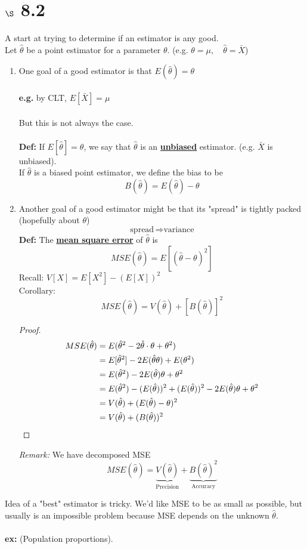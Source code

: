\documentclass[12pt]{article}
\newcommand{\E}[1]{E\left( {#1} \right)}
\newcommand{\brac}[1]{\left[ {#1} \right] }
\newcommand{\xbar}{\bar{X}}
\begin{document}
\section*{$\S$ 8.2}
A start at trying to determine if an estimator is any good.\vspace{0.08in}\\
Let $\hat{\theta}$ be a point estimator for a parameter $\theta$. (e.g. $\theta = \mu, \quad \hat{\theta} = \xbar$)
\begin{enumerate}[label=\textbf{\arabic*}.)]
    \item One goal of a good estimator is that $\E{\hat{\theta}} = \theta$\\\\\textbf{e.g.} by CLT, $E[\xbar] = \mu$\\\\
But this is not always the case.\\
\\\textbf{Def:} If $E[\hat{\theta}]=\theta$, we say that $\hat{\theta}$ is an \textbf{\underline{unbiased}} estimator. (e.g. $\xbar$ is unbiased).\\
If $\hat{\theta}$ is a biased point estimator, we define the bias to be
$$B(\hat{\theta}) = E(\hat{\theta}) - \theta$$
    \item  Another goal of a good estimator might be that its "spread" is tightly packed (hopefully about $\theta$)
$$\text{spread}\, \Longrightarrow \text{variance}$$
\textbf{Def:} The \textbf{\underline{mean square error}} of $\hat{\theta}$ is
$$MSE(\hat{\theta}) = E\brac{(\hat{\theta} - \theta)^2}$$
Recall: $V[X] = E[X^2] - (E[X])^2$\\
Corollary:
$$MSE(\hat{\theta}) = V(\hat{\theta}) + [B(\hat{\theta})]^2$$
\begin{proof}
    \begin{align}
        MSE(\hat{\theta}) &= E(\hat{\theta}^2 - 2\hat{\theta}\cdot \theta + \theta ^2) \notag\\
        &= E[\hat{\theta}^2] - 2E(\hat{\theta}\theta) +E(\theta ^2) \notag\\
        &= E(\hat{\theta}^2) - 2E(\hat{\theta})\theta + \theta^2 \notag \\
        &= E(\hat{\theta}^2) - (E(\hat{\theta}))^2 + (E(\hat{\theta}))^2 - 2E(\hat{\theta})\theta + \theta ^2\notag\\
        &= V(\hat{\theta}) + (E(\hat{\theta})-\theta)^2\notag\\
        &= V(\hat{\theta}) + (B(\Hat{\theta}))^2\notag
    \end{align}
\end{proof}
\textit{Remark:} We have decomposed MSE
$$MSE(\hat{\theta}) = \underbrace{V(\hat{\theta})}_{\text{Precision}} + \underbrace{B(\hat{\theta})^2}_{\text{Accuracy}}$$
\end{enumerate}
Idea of a "best" estimator is tricky. We'd like MSE to be as small as possible, but usually is an impossible problem because MSE depends on the unknown $\hat{\theta}$.\\\\
\textbf{ex:} (Population proportions).\\\\
\end{document}
